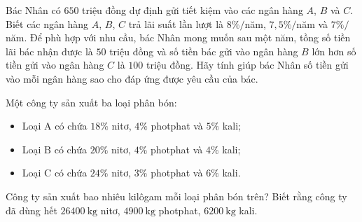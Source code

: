 \begin{bt}
\begin{bt}
	Bác Nhân có $650$ triệu đồng dự định gửi tiết kiệm vào các ngân hàng $A$, $B$ và $C$. Biết các ngân hàng $A$, $B$, $C$ trả lãi suất lần lượt là $8 \% /$năm, $7{,}5 \% /$năm và $7 \% /$năm. Để phù hợp với nhu cầu, bác Nhân mong muốn sau một năm, tồng số tiền lãi bác nhận được là $50$ triệu đồng và số tiền bác gửi vào ngân hàng $B$ lớn hơn số tiền gửi vào ngân hàng $C$ là $100$ triệu đồng. Hãy tính giúp bác Nhân số tiền gửi vào mỗi ngân hàng sao cho đáp ứng được yêu cầu của bác.
		\end{bt}
\begin{bt}%
	Một công ty sản xuất ba loại phân bón:\begin{itemize}
	\item Loại $\mathrm{A}$ có chứa $18 \%$ nitơ, $4 \%$ photphat và $5 \%$ kali;
	\item Loại $\mathrm{B}$ có chứa $20 \%$ nitơ, $4 \%$ photphat và $4 \%$ kali;
	\item Loại $\mathrm{C}$ có chứa $24 \%$ nitơ, $3 \%$ photphat và $6 \%$ kali.
	\end{itemize}
	Công ty sản xuất bao nhiêu kilôgam mỗi loại phân bón trên? Biết rằng công ty đã dùng hết $26400 \mathrm{~kg}$ nitơ, $4900 \mathrm{~kg}$ photphat, $6200 \mathrm{~kg}$ kali.
\end{bt}
\end{bt}
